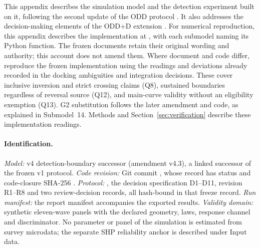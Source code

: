 
This appendix describes the simulation model and the detection experiment built on it, following the second update of the ODD protocol \cite{grimm2020odd}. It also addresses the decision-making elements of the ODD+D extension \cite{muller2013oddd}. %
For numerical reproduction, this appendix describes the implementation at , with each submodel naming its Python function. The frozen documents retain their original wording and authority; this account does not amend them. Where document and code differ, reproduce the frozen implementation using the readings and deviations already recorded in the docking ambiguities and integration decisions. These cover inclusive inversion and strict crossing claims (Q8), sustained boundaries regardless of reversal source (Q12), and main-curve validity without an eligibility exemption (Q13). G2 substitution follows the later amendment and code, as explained in Submodel~14. Methods and Section~\ref{sec:verification} describe these implementation readings. %

\paragraph{Identification.}
\emph{Model:} v4 detection-boundary successor (amendment v4.3), a linked successor of the frozen v1 protocol. \emph{Code revision:} Git commit , whose record  has status  and code-closure SHA-256 \allowbreak{}\allowbreak{}\allowbreak{}\allowbreak{}\allowbreak{}\allowbreak{}\allowbreak{}. \emph{Protocol:} , the decision specification D1--D11, revision R1--R8 and two review-decision records, all hash-bound in that freeze record. \emph{Run manifest:} the report manifest accompanies the exported results. \emph{Validity domain:} synthetic eleven-wave panels with the declared geometry, laws, response channel and discriminator. No parameter or panel of the simulation is estimated from survey microdata; the separate SHP reliability anchor is described under Input data.

